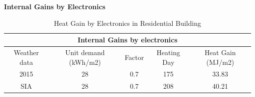\documentclass[11pt, a4paper]{article}
\theoremstyle{definition}
\begin{document}
		\textbf{Internal Gains by Electronics}\\
		\begin{table}[htbp]
		\centering
		\caption{Heat Gain by Electronics in Residential Building}
		    \begin{tabular}{ccccc}
		    \toprule
		    \multicolumn{5}{c}{Internal Gains by electronics} \\
		    \midrule
		    \multicolumn{1}{p{5.355em}}{Weather data} & \multicolumn{1}{p{5.355em}}{Unit demand (kWh/m2)} & \multicolumn{1}{p{5.355em}}{Factor} & \multicolumn{1}{p{5.355em}}{Heating Day} & \multicolumn{1}{p{5.355em}}{Heat Gain (MJ/m2)} \\
		    2015  & 28    & 0.7   & 175   & 33.83 \\
		    SIA   & 28    & 0.7   & 208   & 40.21 \\
		    \bottomrule
		    \end{tabular}%
		  \label{tab:HonggElecGain}%
		\end{table}%
\end{document}

